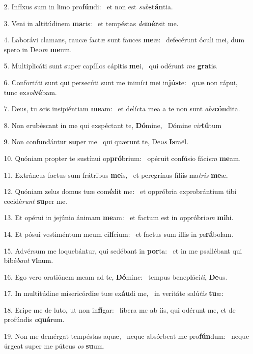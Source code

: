 2. Infíxus sum in limo pro\textbf{fún}di: \ast\  et non est \textit{sub}\textbf{stán}tia.\

3. Veni in altitúdinem \textbf{ma}ris: \ast\  et tempéstas \textit{de}\textbf{mér}sit me.\

4. Laborávi clamans, raucæ factæ sunt fauces \textbf{me}æ: \ast\  defecérunt óculi mei, dum spero in De\textit{um} \textbf{me}um.\

5. Multiplicáti sunt super capíllos cápitis \textbf{me}i, \ast\  qui odérunt \textit{me} \textbf{gra}tis.\

6. Confortáti sunt qui persecúti sunt me inimíci mei in\textbf{jús}te: \ast\  quæ non rápui, tunc ex\textit{sol}\textbf{vé}bam.\

7. Deus, tu scis insipiéntiam \textbf{me}am: \ast\  et delícta mea a te non sunt \textit{abs}\textbf{cón}dita.\

8. Non erubéscant in me qui exspéctant te, \textbf{Dó}mine, \ast\  Dómine \textit{vir}\textbf{tú}tum\

9. Non confundántur \textbf{su}per me \ast\  qui quærunt te, De\textit{us} \textbf{Is}raël.\

10. Quóniam propter te sustínui op\textbf{pró}brium: \ast\  opéruit confúsio fáci\textit{em} \textbf{me}am.\

11. Extráneus factus sum frátribus \textbf{me}is, \ast\  et peregrínus fíliis ma\textit{tris} \textbf{me}æ.\

12. Quóniam zelus domus tuæ com\textbf{é}dit me: \ast\  et oppróbria exprobrántium tibi cecidé\textit{runt} \textbf{su}per me.\

13. Et opérui in jejúnio ánimam \textbf{me}am: \ast\  et factum est in oppróbri\textit{um} \textbf{mi}hi.\

14. Et pósui vestiméntum meum ci\textbf{lí}cium: \ast\  et factus sum illis in \textit{pa}\textbf{rá}bolam.\

15. Advérsum me loquebántur, qui sedébant in \textbf{por}ta: \ast\  et in me psallébant qui bibé\textit{bant} \textbf{vi}num.\

16. Ego vero oratiónem meam ad te, \textbf{Dó}mine: \ast\  tempus benepláci\textit{ti}, \textbf{De}us.\

17. In multitúdine misericórdiæ tuæ ex\textbf{áu}di me, \ast\  in veritáte salú\textit{tis} \textbf{tu}æ:\

18. Eripe me de luto, ut non in\textbf{fí}gar: \ast\  líbera me ab iis, qui odérunt me, et de profúndis \textit{a}\textbf{quá}rum.\

19. Non me demérgat tempéstas aquæ, \dag\  neque absórbeat me pro\textbf{fún}dum: \ast\  neque úrgeat super me púteus \textit{os} \textbf{su}um.\


